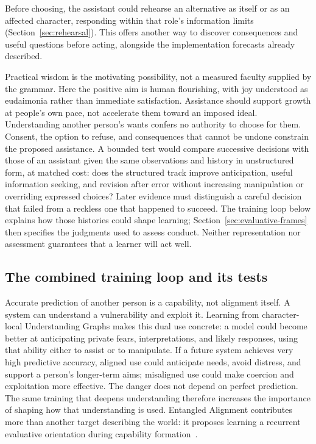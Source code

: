 \documentclass[10pt]{article}
\begin{document}
Before choosing, the assistant could rehearse an alternative as itself or as
an affected character, responding within that role's information limits
(Section~\ref{sec:rehearsal}). This offers another way to discover consequences
and useful questions before acting, alongside the implementation forecasts
already described.

Practical wisdom is the motivating possibility, not a measured faculty supplied
by the grammar. Here the positive aim is human flourishing, with joy understood
as eudaimonia rather than immediate satisfaction. Assistance should support
growth at people's own pace, not accelerate them toward an imposed ideal.
Understanding another person's wants confers no authority to
choose for them. Consent, the option to refuse, and consequences that cannot
be undone constrain the proposed assistance. A bounded test would compare
successive decisions with those of an assistant given the same observations
and history in unstructured form, at matched cost: does the structured track
improve anticipation, useful information
seeking, and revision after error without increasing manipulation or overriding
expressed choices? Later evidence must distinguish a careful decision that
failed from a reckless one that happened to succeed. The training loop below explains how those histories could shape learning;
Section~\ref{sec:evaluative-frames} then specifies the judgments used to assess
conduct. Neither representation nor assessment guarantees that a learner
will act well.

\subsection{The combined training loop and its tests}
\label{sec:combined-training}

Accurate prediction of another person is a capability, not alignment itself.
A system can understand a vulnerability and exploit it. Learning from
character-local Understanding Graphs makes this dual use concrete: a model
could become better at anticipating private fears, interpretations, and likely
responses, using that ability either to assist or to manipulate. If a future
system achieves very high predictive accuracy, aligned use could anticipate
needs, avoid distress, and support a person's longer-term aims; misaligned use
could make coercion and exploitation more effective. The danger does not
depend on perfect prediction. The same
training that deepens understanding therefore increases the importance of
shaping how that understanding is used. Entangled Alignment
contributes more than another target describing the world: it
proposes learning a recurrent evaluative orientation during capability
formation~\cite{westerbergEntangled2026}.
\end{document}
